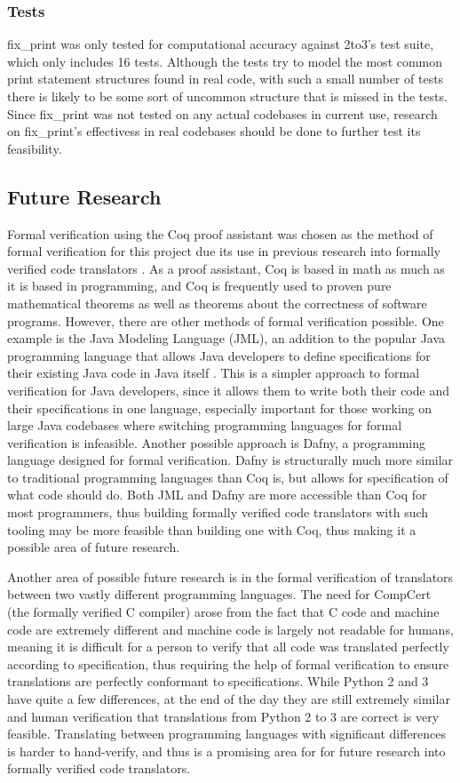 \subsubsection{Tests}
fix\_print was only tested for computational accuracy against 2to3's test suite, which only includes 16 tests. Although the tests try to model the most common print statement structures found in real code, with such a small number of tests there is likely to be some sort of uncommon structure that is missed in the tests. Since fix\_print was not tested on any actual codebases in current use, research on fix\_print's effectivess in real codebases should be done to further test its feasibility.

\subsection{Future Research}
Formal verification using the Coq proof assistant was chosen as the method of formal verification for this project due its use in previous research into formally verified code translators \autocite{Leroy}\autocite{Zhao}. As a proof assistant, Coq is based in math as much as it is based in programming, and Coq is frequently used to proven pure mathematical theorems as well as theorems about the correctness of software programs. However, there are other methods of formal verification possible. One example is the Java Modeling Language (JML), an addition to the popular Java programming language that allows Java developers to define specifications for their existing Java code in Java itself \autocite{Burdy}. This is a simpler approach to formal verification for Java developers, since it allows them to write both their code and their specifications in one language, especially important for those working on large Java codebases where switching programming languages for formal verification is infeasible. Another possible approach is Dafny, a programming language designed for formal verification. Dafny is structurally much more similar to traditional programming languages than Coq is, but allows for specification of what code should do. Both JML and Dafny are more accessible than Coq for most programmers, thus building formally verified code translators with such tooling may be more feasible than building one with Coq, thus making it a possible area of future research.

Another area of possible future research is in the formal verification of translators between two vastly different programming languages. The need for CompCert (the formally verified C compiler) arose from the fact that C code and machine code are extremely different and machine code is largely not readable for humans, meaning it is difficult for a person to verify that all code was translated perfectly according to specification, thus requiring the help of formal verification to ensure translations are perfectly conformant to specifications. While Python 2 and 3 have quite a few differences, at the end of the day they are still extremely similar and human verification that translations from Python 2 to 3 are correct is very feasible. Translating between programming languages with significant differences is harder to hand-verify, and thus is a promising area for for future research into formally verified code translators.